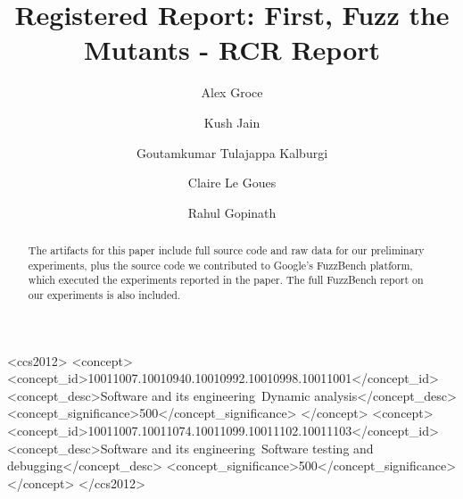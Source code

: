 \documentclass[manuscript,screen,review]{acmart}
\author{Alex Groce}
\affiliation{\institution{Northern Arizona University}\country{United States}}
\author{Kush Jain}
\affiliation{\institution{Carnegie Mellon University}\country{United States}}
\author{Goutamkumar Tulajappa Kalburgi}
\affiliation{\institution{Northern Arizona University}\country{United States}}
\author{Claire Le Goues}
\affiliation{\institution{Carnegie Mellon University}\country{United States}}
\author{Rahul Gopinath}
\affiliation{\institution{University of Sydney}\country{Australia}}
\begin{document}
\title{Registered Report: First, Fuzz the Mutants - RCR Report}


\renewcommand{\shortauthors}{Groce et al.}

\begin{abstract}
The artifacts for this paper include full source code and raw data for
our preliminary experiments, plus the source code we contributed to
Google's FuzzBench platform, which executed the experiments reported
in the paper.  The full FuzzBench report on our experiments is also included.
\end{abstract}


\begin{CCSXML}
<ccs2012>
<concept>
<concept_id>10011007.10010940.10010992.10010998.10011001</concept_id>
<concept_desc>Software and its engineering~Dynamic analysis</concept_desc>
<concept_significance>500</concept_significance>
</concept>
<concept>
<concept_id>10011007.10011074.10011099.10011102.10011103</concept_id>
<concept_desc>Software and its engineering~Software testing and debugging</concept_desc>
<concept_significance>500</concept_significance>
</concept>
</ccs2012>
\end{CCSXML}



\maketitle
\end{document}
